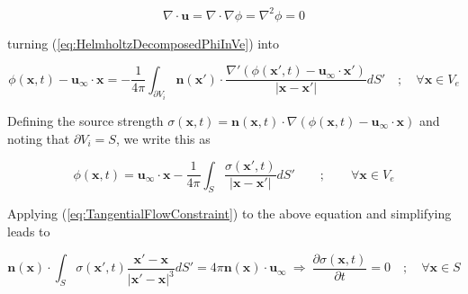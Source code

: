 \documentclass{article}
\begin{document}
\begin{equation}
\label{eq:IncompressiblePotentialFlowEquation}
	\nabla \cdot \mathbf{u} = \nabla \cdot \nabla \phi = \nabla^2 \phi = 0
\end{equation}

turning (\ref{eq:HelmholtzDecomposedPhiInVe}) into

\begin{equation*}
	\phi(\mathbf{x}, t) - \mathbf{u}_{\infty} \cdot \mathbf{x} = - \frac{1}{4
	\pi} \int_{\partial V_i} \mathbf{n}(\mathbf{x}') \cdot \frac{\nabla' \left(
	\phi(\mathbf{x}', t) - \mathbf{u}_{\infty} \cdot \mathbf{x}' \right)}{|
	\mathbf{x} - \mathbf{x}'|} dS' \quad ; \quad \forall \mathbf{x} \in V_e
\end{equation*}

Defining the source strength $\sigma(\mathbf{x}, t) = \mathbf{n}(\mathbf{x}, t)
\cdot \nabla \left( \phi(\mathbf{x}, t) - \mathbf{u}_{\infty} \cdot \mathbf{x}
\right)$ and noting that $\partial V_i = S$, we write this as

\begin{equation*}
	\phi(\mathbf{x}, t) = \mathbf{u}_{\infty} \cdot \mathbf{x} - \frac{1}{4 \pi}
	\int_S \frac{\sigma(\mathbf{x}', t)}{|\mathbf{x} - \mathbf{x}'|} dS' \qquad
	; \qquad \forall \mathbf{x} \in V_e
\end{equation*}

Applying (\ref{eq:TangentialFlowConstraint}) to the above equation and
simplifying leads to

\begin{equation}
\label{eq:IncompressibleSourcePanelMethodEquation}
	\mathbf{n}(\mathbf{x}) \cdot \int_S \sigma(\mathbf{x}', t) \frac{\mathbf{x}'
	- \mathbf{x}}{|\mathbf{x}' - \mathbf{x}|^3} dS' = 4 \pi \mathbf{n}(
	\mathbf{x}) \cdot \mathbf{u}_{\infty} \: \Rightarrow \: \frac{\partial
	\sigma(\mathbf{x}, t)}{\partial t} = 0 \quad ; \quad \forall \mathbf{x} \in
	S
\end{equation}
\end{document}
